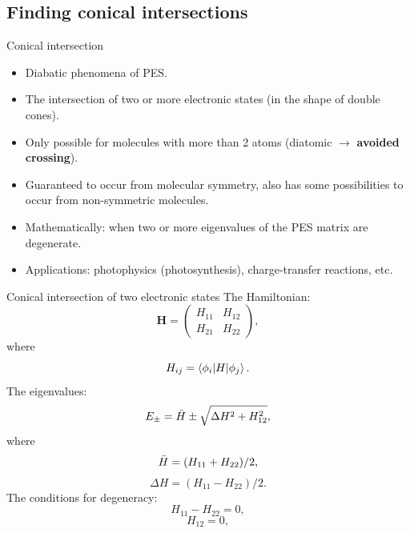 \documentclass{beamer}
\newcommand\Fontvi{\fontsize{8}{7.2}\selectfont} %
\begin{document}
\subsection{Finding conical intersections}
\begin{frame}{Conical intersection}
    \begin{itemize}
        \item Diabatic phenomena of PES.
        \item The intersection of two or more electronic states (in the shape of double cones).
        \item Only possible for molecules with more than 2 atoms (diatomic $\rightarrow$ \textbf{avoided crossing}).
        \item Guaranteed to occur from molecular symmetry, also has some possibilities to occur from non-symmetric molecules.
        \item Mathematically: when two or more eigenvalues of the PES matrix are degenerate.
        \item Applications: photophysics (photosynthesis), charge-transfer reactions, etc.
    \end{itemize}
\end{frame}
\begin{frame}{Conical intersection of two electronic states}
    \Fontvi
    The Hamiltonian:
    \begin{equation}
        \mathbf{H} = 
        \begin{pmatrix}
            H_{11} & H_{12} \\
            H_{21} & H_{22}
        \end{pmatrix},
        \label{eq:conintmat}
    \end{equation}
    where 
    \begin{equation}
        H_{ij} = \braket{\phi_i|H|\phi_j}.
    \end{equation}
    The eigenvalues:
    \begin{equation}
        E_{\pm} = \Bar{H} \pm \sqrt{\Delta H^2 + H_{12}^2},
    \end{equation}
    where
    \begin{equation}
        \Bar{H} = (H_{11} + H_{22})/2,
    \end{equation}
    \begin{equation}
        \Delta H = (H_{11} - H_{22})/2.
    \end{equation}
    The conditions for degeneracy:
    \begin{equation}
        H_{11} - H_{22} = 0,
    \end{equation}
    \begin{equation}
        H_{12} = 0,
    \end{equation}
\end{frame}
\end{document}
